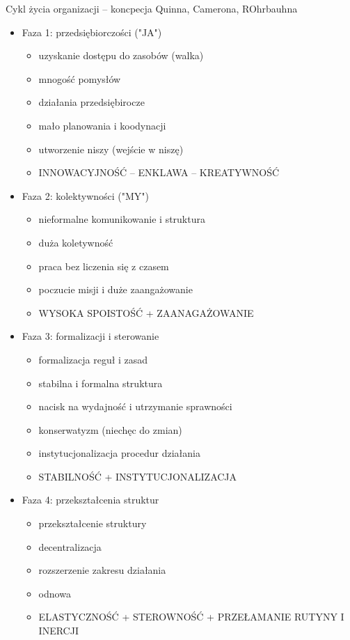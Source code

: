 \documentclass[a4paper,10pt]{report}
\begin{document}
\noindent Cykl życia organizacji -- koncpecja Quinna, Camerona, ROhrbauhna
\begin{itemize}
	\item Faza 1: przedsiębiorczości ("JA")
	\begin{itemize}
		\item uzyskanie dostępu do zasobów (walka)
		\item mnogość pomysłów
		\item działania przedsiębirocze
		\item mało planowania i koodynacji
		\item utworzenie niszy (wejście w niszę)
		\item INNOWACYJNOŚĆ -- ENKLAWA -- KREATYWNOŚĆ
	\end{itemize}
	\item Faza 2: kolektywności ("MY")
	\begin{itemize}
		\item nieformalne komunikowanie i struktura
		\item duża koletywność
		\item praca bez liczenia się z czasem
		\item poczucie misji i duże zaangażowanie
		\item WYSOKA SPOISTOŚĆ + ZAANAGAŻOWANIE
	\end{itemize}
	\item Faza 3: formalizacji i sterowanie
	\begin{itemize}
		\item formalizacja reguł i zasad
		\item stabilna i formalna struktura
		\item nacisk na wydajność i utrzymanie sprawności
		\item konserwatyzm (niechęc do zmian)
		\item instytucjonalizacja procedur działania
		\item STABILNOŚĆ + INSTYTUCJONALIZACJA
	\end{itemize}
	\item Faza 4: przekształcenia struktur
	\begin{itemize}
		\item przekształcenie struktury
		\item decentralizacja
		\item rozszerzenie zakresu działania
		\item odnowa
		\item ELASTYCZNOŚĆ + STEROWNOŚĆ + PRZEŁAMANIE RUTYNY I INERCJI
	\end{itemize}
\end{itemize}
\end{document}
